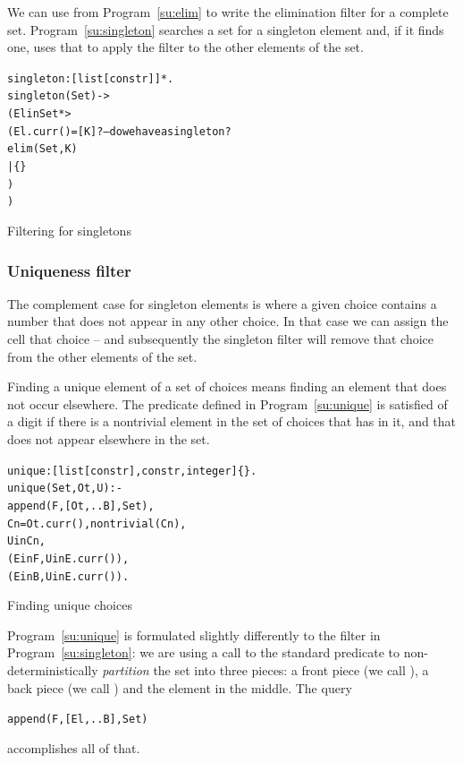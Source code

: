 We can use  from Program~\vref{su:elim} to write the elimination filter for a complete set. Program~\vref{su:singleton} searches a set for a singleton element and, if it finds one, uses that to apply the  filter to the other elements of the set.
\begin{program}
\vspace{0.5ex}
\begin{alltt}
singleton:[list[constr]]*.
singleton(Set) ->
  ( El in Set *>
    ( El.curr()=[K] ?  -- do we have a singleton?
      elim(Set,K)
    | \{\}
    )
  )
\end{alltt}
\vspace{-2ex}
\caption{Filtering for singletons}
\label{su:singleton}
\end{program}

\subsubsection{Uniqueness filter}
The complement case for singleton elements is where a given choice contains a number that does not appear in any other choice. In that case we can assign the cell that choice -- and subsequently the singleton filter will remove that choice from the other elements of the set.

Finding a unique element of a set of choices means finding an element that does not occur elsewhere. The  predicate defined in Program~\vref{su:unique} is satisfied of a digit  if there is a nontrivial element in the set of choices that has  in it, and that  does not appear elsewhere in the set.
\begin{program}
\vspace{0.5ex}
\begin{alltt}
unique:[list[constr],constr,integer]\{\}.
unique(Set,Ot,U) :-
  append(F,[Ot,..B],Set),
  Cn = Ot.curr(), nontrivial(Cn),
  U in Cn, 
  \nasf(E in F, U in E.curr()),
  \nasf(E in B, U in E.curr()). 
\end{alltt}
\vspace{-2ex}
\caption{Finding unique choices}
\label{su:unique}
\end{program}
Program~\vref{su:unique} is formulated slightly differently to the  filter in Program~\vref{su:singleton}: we are using a call to the standard predicate  to non-deterministically \emph{partition} the set into three  pieces: a front piece (we call ), a back piece (we call ) and the element in the middle. The query
\begin{alltt}
append(F,[El,..B],Set)
\end{alltt}
accomplishes all of that. 

